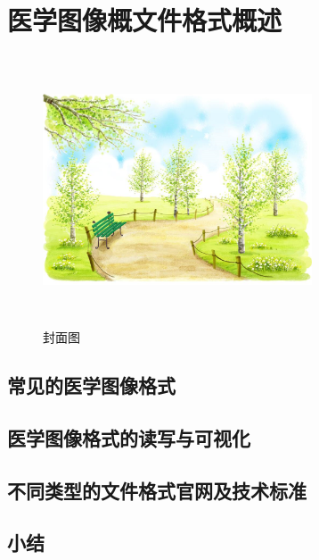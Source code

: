 

\chapter{医学图像概文件格式概述}


\begin{figure}[H]
    \centering
    \includegraphics[width=8cm, height=8cm]{fig/screen.png}
    \caption{封面图}
    \label{fig:1-1}
\end{figure}
\section{常见的医学图像格式}
\section{医学图像格式的读写与可视化}
\section{不同类型的文件格式官网及技术标准}
\section{小结}